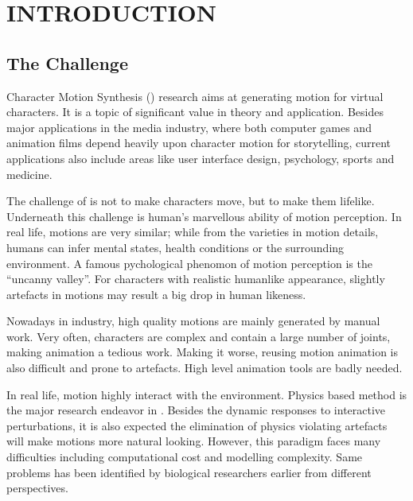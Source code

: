 \chapter{INTRODUCTION}
\label{chap:intro}
\graphicspath{{Introduction/IntroductionFigs/EPS/}{Introduction/IntroductionFigs/}}

\section{The Challenge}
Character Motion Synthesis (\cms) research aims at generating motion for virtual characters.
It is a topic of significant value in theory and application. 
Besides major applications in the media industry, where both computer games and animation films depend heavily upon character motion for storytelling, 
current applications also include  areas like user interface design, psychology, sports and medicine.

The challenge of \cms  is not to make characters move, but  to make them lifelike. 
Underneath this challenge is human's marvellous ability of motion perception. 
In real life, motions are very similar; 
while from the varieties in motion details, humans can infer mental states, health conditions or the surrounding environment.
A famous pychological phenomon of motion perception is the ``uncanny valley''.
For characters with realistic humanlike appearance, slightly artefacts in motions may result a big drop in human likeness.



Nowadays in industry, high quality motions are mainly generated by manual work. 
Very often, characters are complex and contain a large number of joints, making animation a tedious work.
Making it worse, reusing motion animation is also difficult and prone to artefacts.
High level animation tools are badly needed. 

In real life, motion highly interact with the environment.
Physics based method  is the major research endeavor in \cms.
Besides  the dynamic responses to interactive perturbations, it is  also expected  the elimination of physics violating  artefacts  will make motions more natural looking.
However, this paradigm faces many difficulties including computational cost and modelling complexity.
Same problems has been identified by biological researchers earlier from different perspectives.


